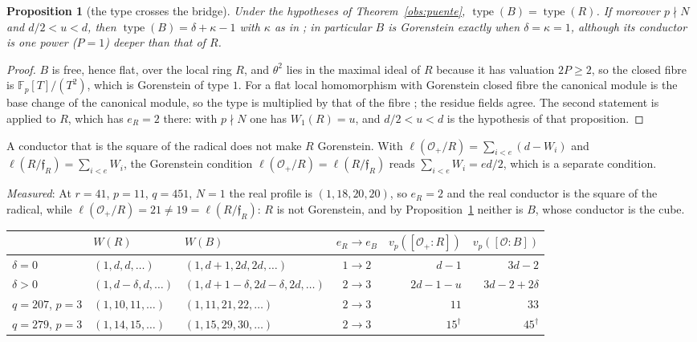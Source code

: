 \documentclass[11pt,a4paper]{article}
\newtheorem{proposition}[theorem]{Proposition}
\theoremstyle{definition}
\newcommand{\FF}{\mathbb{F}}
\newcommand{\cO}{\mathcal{O}}
\newcommand{\medido}[1]{\emph{Measured}: #1}
\begin{document}
\begin{proposition}[the type crosses the bridge]\label{prop:tipopuente}
Under the hypotheses of Theorem~\ref{obs:puente}, $\operatorname{type}(B)=\operatorname{type}(R)$.
If moreover $p\nmid N$ and $d/2<u<d$, then $\operatorname{type}(B)=\delta+\kappa-1$ with $\kappa$
as in \cite[Prop.~11]{Cond}; in particular $B$ is Gorenstein exactly when $\delta=\kappa=1$,
although its conductor is one power ($P=1$) deeper than that of $R$.
\end{proposition}

\begin{proof}
$B$ is free, hence flat, over the local ring $R$, and $\theta^2$ lies in the maximal ideal of $R$
because it has valuation $2P\ge2$, so the closed fibre is $\FF_p[T]/(T^2)$, which is Gorenstein of type
$1$. For a flat local homomorphism with Gorenstein closed fibre the canonical module is the base
change of the canonical module, so the type is multiplied by that of the fibre \cite[\S3.3]{BH}; the residue fields
agree. The second statement is \cite[Prop.~11]{Cond} applied to $R$, which has $e_R=2$ there: with
$p\nmid N$ one has $W_1(R)=u$, and $d/2<u<d$ is the hypothesis of that proposition.
\end{proof}

A conductor that is the square of the radical does not make $R$ Gorenstein. With
$\ell(\cO_+/R)=\sum_{i<e}(d-W_i)$ and $\ell(R/\mathfrak f_R)=\sum_{i<e}W_i$, the Gorenstein
condition $\ell(\cO_+/R)=\ell(R/\mathfrak f_R)$ reads $\sum_{i<e}W_i=ed/2$, which is a separate
condition.

\medido{At $r=41$, $p=11$, $q=451$, $N=1$ the real profile is $(1,18,20,20)$, so $e_R=2$ and the
real conductor is the square of the radical, while $\ell(\cO_+/R)=21\neq19=\ell(R/\mathfrak f_R)$:
$R$ is not Gorenstein, and by Proposition~\ref{prop:tipopuente} neither is $B$, whose conductor is
the cube.}

\medskip
\begin{center}\small
{}
\begin{tabular}{@{}lllcrr@{}}
\toprule
 & $W(R)$ & $W(B)$ & $e_R\to e_B$ & $v_p([\cO_+:R])$ & $v_p([\cO:B])$ \\
\midrule
$\delta=0$ & $(1,d,d,\dots)$ & $(1,d{+}1,2d,2d,\dots)$ & $1\to2$ & $d-1$ & $3d-2$ \\
$\delta>0$ & $(1,d{-}\delta,d,\dots)$ & $(1,d{+}1{-}\delta,2d{-}\delta,2d,\dots)$ & $2\to3$ &
  $2d-1-u$ & $3d-2+2\delta$ \\
\midrule
$q=207$, $p=3$ & $(1,10,11,\dots)$ & $(1,11,21,22,\dots)$ & $2\to3$ & $11$ & $33$ \\
$q=279$, $p=3$ & $(1,14,15,\dots)$ & $(1,15,29,30,\dots)$ & $2\to3$ & $15^\dagger$ & $45^\dagger$ \\
\bottomrule
\end{tabular}
\end{center}
\end{document}
